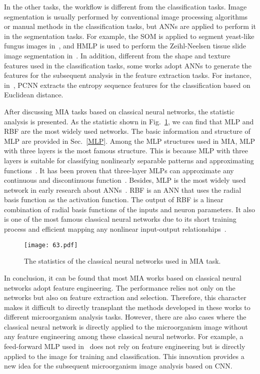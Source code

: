 In the other tasks, the workflow is different from the classification tasks. Image segmentation is usually performed by conventional image processing algorithms or manual methods in the classification tasks, but ANNs are applied to perform it in the segmentation tasks. For example, the SOM is applied to segment yeast-like fungus images in~\cite{Shabtai-1996-MMMC}, and HMLP is used to perform the Zeihl-Neelsen tissue slide image segmentation in~\cite{Osman-2010-STBZ}. In addition, different from the shape and texture features used in the classification tasks, some works adopt ANNs to generate the features for the subsequent analysis in the feature extraction tasks. For instance, in~\cite{Zhu-2010-BCUN}, PCNN extracts the entropy sequence features for the classification based on Euclidean distance.


After discussing MIA tasks based on classical neural networks, the statistic analysis is presented. As the statistic shown in Fig.~\ref{fig63}, we can find that MLP and RBF are the most widely used networks. The basic information and structure of MLP are provided in Sec.~\ref{MLP}. Among the MLP structures used in MIA, MLP with three layers is the most famous structure. This is because MLP with three layers is suitable for classifying nonlinearly separable patterns and approximating functions~\cite{Mirjalili-2011-MOAT}. It has been proven that three-layer MLPs can approximate any continuous and discontinuous function~\cite{Chen-1994-ARBL}. Besides, MLP is the most widely used network in early research about ANNs~\cite{Pistikopoulos-2011-ESCA}. RBF is an ANN that uses the radial basis function as the activation function. The output of RBF is a linear combination of radial basis functions of the inputs and neuron parameters. It also is one of the most famous classical neural networks due to its short training process and efficient mapping any nonlinear input-output relationships~\cite{Behera-2010-WTST}.

\begin{figure}[htbp!]
\centering
\texttt{[image: 63.pdf]}
\caption{The statistics of the classical neural networks used in MIA task.}
\label{fig63}
\end{figure}

In conclusion, it can be found that most MIA works based on classical neural networks adopt feature engineering. The performance relies not only on the networks but also on feature extraction and selection. Therefore, this character makes it difficult to directly transplant the methods developed in these works to different microorganism analysis tasks. However, there are also cases where the classical neural network is directly applied to the microorganism image without any feature engineering among these classical neural networks. For example, a feed-forward MLP used in~\cite{Wit-1998-AAAN} does not rely on feature engineering but is directly applied to the image for training and classification. This innovation provides a new idea for the subsequent microorganism image analysis based on CNN.




